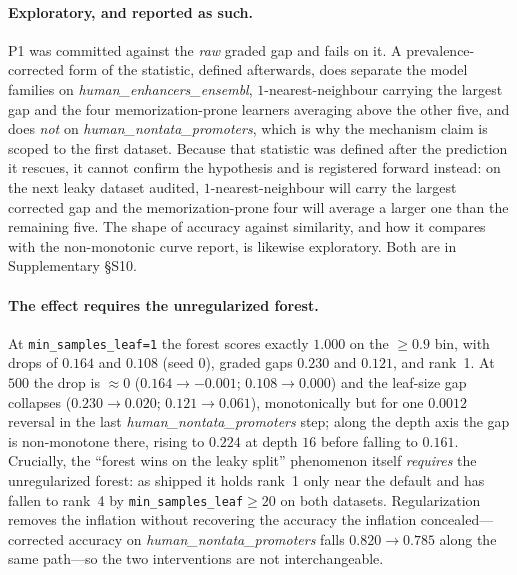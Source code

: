 \documentclass[webpdf,modern,large,namedate]{oup-authoring-template}%
\begin{document}
\paragraph{Exploratory, and reported as such.} P1 was committed against the \emph{raw} graded gap
and fails on it. A prevalence-corrected form of the statistic, defined afterwards, does separate the
model families on \textit{human\_enhancers\_ensembl}, $1$-nearest-neighbour carrying the largest gap
and the four memorization-prone learners averaging above the other five, and does \emph{not} on
\textit{human\_nontata\_promoters}, which is why the mechanism claim is scoped to the first dataset.
Because that statistic was defined after the prediction it rescues, it cannot confirm the hypothesis
and is registered forward instead: on the next leaky dataset audited, $1$-nearest-neighbour will
carry the largest corrected gap and the memorization-prone four will average a larger one than the
remaining five. The shape of accuracy against similarity, and how it compares with the non-monotonic
curve \citet{rafi2026} report, is likewise exploratory. Both are in Supplementary \S S10.

\paragraph{The effect requires the unregularized forest.}\label{sec:r-regpath} At \texttt{min\_samples\_leaf=1} the forest scores exactly $1.000$ on the $\ge0.9$ bin, with drops of $0.164$ and $0.108$ (seed $0$), graded gaps $0.230$ and $0.121$, and rank~1. At $500$ the drop is $\approx0$ ($0.164\to-0.001$; $0.108\to0.000$) and the leaf-size gap collapses ($0.230\to0.020$; $0.121\to0.061$), monotonically but for one $0.0012$ reversal in the last \textit{human\_nontata\_promoters} step; along the depth axis the gap is non-monotone there, rising to $0.224$ at depth $16$ before falling to $0.161$. Crucially, the ``forest wins on the leaky split'' phenomenon itself \emph{requires} the unregularized forest: as shipped it holds rank~1 only near the default and has fallen to rank~4 by \texttt{min\_samples\_leaf}$\ge20$ on both datasets. Regularization removes the inflation without recovering the accuracy the inflation concealed---corrected accuracy on \textit{human\_nontata\_promoters} falls $0.820\to0.785$ along the same path---so the two interventions are not interchangeable.
\end{document}
